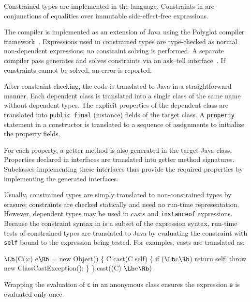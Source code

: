 %

Constrained types are implemented in the \Xten{}
language.
Constraints in \Xten{} are conjunctions of equalities over immutable
side-effect-free expressions.


The \Xten{} compiler is implemented as an extension of
Java using the Polyglot compiler framework~\cite{ncm03}.
Expressions used in constrained
types are type-checked as normal non-dependent \Xten{} expressions;
no constraint solving is performed.
A separate compiler pass generates and solves constraints via an
ask--tell interface~\cite{my-thesis-book}.
If constraints cannot be solved, an error is reported.

After constraint-checking, the \Xten{} code is translated to
Java in a straightforward manner.  Each dependent class
is translated into a single class of the same name without dependent
types. The explicit properties of the dependent class are translated
into {\tt public final} (instance) fields of the target class.
A {\tt property} statement in a constructor is translated to a
sequence of assignments to initialize the property fields.

For each property, a getter method is also generated in the
target Java class.
Properties declared in interfaces are translated into getter
method signatures.  Subclasses implementing these interfaces
thus provide the required properties by implementing the
generated interfaces.

Usually, constrained types are simply translated to
non-constrained types by erasure; constraints are checked
statically and need no run-time representation.
However, dependent types may be used in casts
and {\tt instanceof} expressions.  Because the constraint syntax
in \Xten{} is a subset of the \Xten{} expression syntax, run-time tests
of constrained types are translated to Java
by evaluating the constraint with
{\tt self} bound to the expression being tested.
For examples, casts are translated as:
\begin{code}
  $\Lb$(C(:c) e$\Rb$ = 
    new Object() \{
      C cast(C self) \{
        if ($\Lb$c$\Rb$) return self;
        throw new ClassCastException(); \}
    \}.cast((C) $\Lb$e$\Rb$)
\end{code}
\noindent Wrapping the evaluation of {\tt c} in an anonymous class
ensures the expression {\tt e} is evaluated only once.

